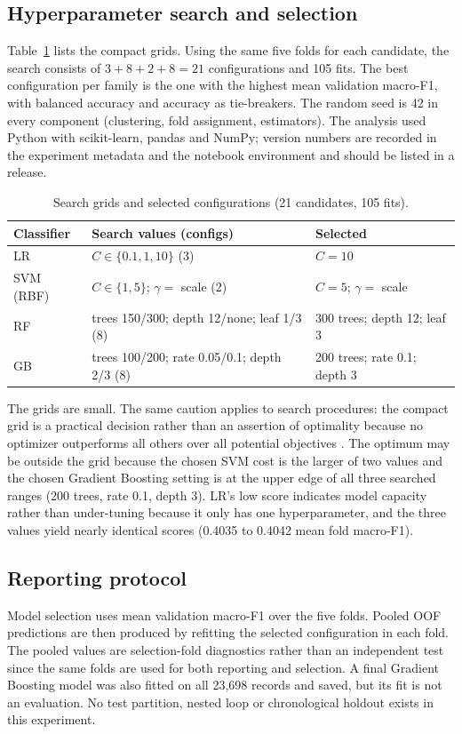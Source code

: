 \documentclass[conference]{IEEEtran}
\begin{document}
\subsection{Hyperparameter search and selection}
Table~\ref{tab:params} lists the compact grids. Using the same five folds for each candidate, the search consists of $3+8+2+8=21$ configurations and 105 fits. The best configuration per family is the one with the highest mean validation macro-F1, with balanced accuracy and accuracy as tie-breakers. The random seed is 42 in every component (clustering, fold assignment, estimators). The analysis used Python with scikit-learn, pandas and NumPy; version numbers are recorded in the experiment metadata and the notebook environment and should be listed in a release.

\begin{table}[t]
\caption{Search grids and selected configurations (21 candidates, 105 fits).}
\label{tab:params}
\centering
\footnotesize
\setlength{\tabcolsep}{3pt}
\begin{tabular}{p{}p{}p{}}
\toprule
Classifier & Search values (configs) & Selected\\
\midrule
LR & $C\in\{0.1,1,10\}$ (3) & $C=10$\\
SVM (RBF) & $C\in\{1,5\}$; $\gamma=$ scale (2) & $C=5$; $\gamma=$ scale\\
RF & trees 150/300; depth 12/none; leaf 1/3 (8) & 300 trees; depth 12; leaf 3\\
GB & trees 100/200; rate 0.05/0.1; depth 2/3 (8) & 200 trees; rate 0.1; depth 3\\
\bottomrule
\end{tabular}
\end{table}

The grids are small. The same caution applies to search procedures: the compact grid is a practical decision rather than an assertion of optimality because no optimizer outperforms all others over all potential objectives \cite{wolpert1997}. The optimum may be outside the grid because the chosen SVM cost is the larger of two values and the chosen Gradient Boosting setting is at the upper edge of all three searched ranges (200 trees, rate 0.1, depth 3). LR's low score indicates model capacity rather than under-tuning because it only has one hyperparameter, and the three values yield nearly identical scores (0.4035 to 0.4042 mean fold macro-F1).

\subsection{Reporting protocol}
Model selection uses mean validation macro-F1 over the five folds. Pooled OOF predictions are then produced by refitting the selected configuration in each fold. The pooled values are selection-fold diagnostics rather than an independent test since the same folds are used for both reporting and selection. A final Gradient Boosting model was also fitted on all 23,698 records and saved, but its fit is not an evaluation. No test partition, nested loop or chronological holdout exists in this experiment.
\end{document}
